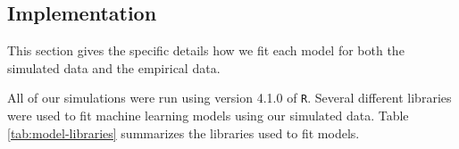 \documentclass{article}
\begin{document}
	
	\subsection{Implementation}
	
	This section gives the specific details how we fit each model for both the simulated data and the empirical data.
	
	All of our simulations were run using version 4.1.0 of \lstinline!R!. Several different libraries were used to fit machine learning models using our simulated data. Table \ref{tab:model-libraries} summarizes the libraries used to fit models.
	
\end{document}
